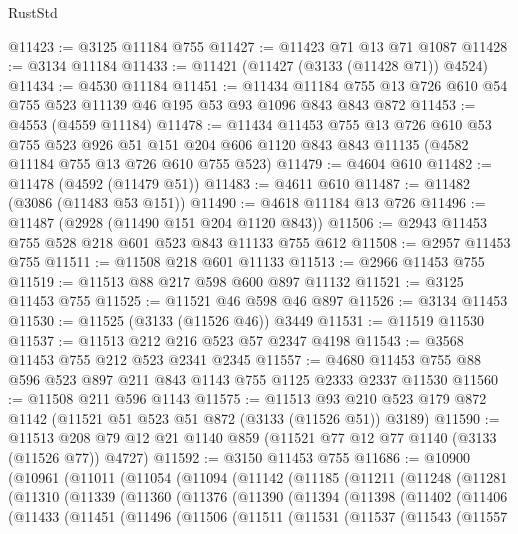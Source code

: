 \begin{lexlean}{RustStd}
\begin{coremodule}
@11423 := @3125 @11184 @755
@11427 := @11423 @71 @13 @71 @1087
@11428 := @3134 @11184
@11433 := @11421 (@11427 (@3133 (@11428 @71)) @4524)
@11434 := @4530 @11184
@11451 := @11434
    @11184
    @755
    @13
    @726
    @610
    @54
    @755
    @523
    @11139
    @46
    @195
    @53
    @93
    @1096
    @843
    @843
    @872
@11453 := @4553 (@4559 @11184)
@11478 := @11434
    @11453
    @755
    @13
    @726
    @610
    @53
    @755
    @523
    @926
    @51
    @151
    @204
    @606
    @1120
    @843
    @843
    @11135
    (@4582 @11184 @755 @13 @726 @610 @755 @523)
@11479 := @4604 @610
@11482 := @11478 (@4592 (@11479 @51))
@11483 := @4611 @610
@11487 := @11482 (@3086 (@11483 @53 @151))
@11490 := @4618 @11184 @13 @726
@11496 := @11487 (@2928 (@11490 @151 @204 @1120 @843))
@11506 := @2943 @11453 @755 @528 @218 @601 @523 @843 @11133 @755 @612
@11508 := @2957 @11453 @755
@11511 := @11508 @218 @601 @11133
@11513 := @2966 @11453 @755
@11519 := @11513 @88 @217 @598 @600 @897 @11132
@11521 := @3125 @11453 @755
@11525 := @11521 @46 @598 @46 @897
@11526 := @3134 @11453
@11530 := @11525 (@3133 (@11526 @46)) @3449
@11531 := @11519 @11530
@11537 := @11513 @212 @216 @523 @57 @2347 @4198
@11543 := @3568 @11453 @755 @212 @523 @2341 @2345
@11557 := @4680 @11453 @755 @88 @596 @523 @897 @211 @843 @1143 @755 @1125 @2333 @2337 @11530
@11560 := @11508 @211 @596 @1143
@11575 := @11513 @93 @210 @523 @179 @872 @1142 (@11521 @51 @523 @51 @872 (@3133 (@11526 @51)) @3189)
@11590 := @11513 @208 @79 @12 @21 @1140 @859 (@11521 @77 @12 @77 @1140 (@3133 (@11526 @77)) @4727)
@11592 := @3150 @11453 @755
@11686 := @10900
    (@10961
      (@11011
        (@11054
          (@11094
            (@11142
              (@11185
                (@11211
                  (@11248
                    (@11281
                      (@11310
                        (@11339
                          (@11360
                            (@11376
                              (@11390
                                (@11394
                                  (@11398
                                    (@11402
                                      (@11406
                                        (@11433
                                          (@11451
                                            (@11496
                                              (@11506
                                                (@11511
                                                  (@11531
                                                    (@11537
                                                      (@11543
                                                        (@11557

\end{coremodule}
\end{lexlean}
